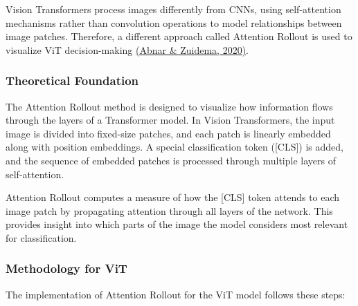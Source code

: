 \documentclass[a4paper,12pt]{report}
\begin{document}
Vision Transformers process images differently from CNNs, using self-attention mechanisms rather than convolution operations to model relationships between image patches. Therefore, a different approach called Attention Rollout is used to visualize ViT decision-making \href{https://arxiv.org/abs/2005.00928}{(Abnar \& Zuidema, 2020)}.

\subsubsection{Theoretical Foundation}

The Attention Rollout method is designed to visualize how information flows through the layers of a Transformer model. In Vision Transformers, the input image is divided into fixed-size patches, and each patch is linearly embedded along with position embeddings. A special classification token ([CLS]) is added, and the sequence of embedded patches is processed through multiple layers of self-attention.

Attention Rollout computes a measure of how the [CLS] token attends to each image patch by propagating attention through all layers of the network. This provides insight into which parts of the image the model considers most relevant for classification.

\subsubsection{Methodology for ViT}

The implementation of Attention Rollout for the ViT model follows these steps:
\end{document}
